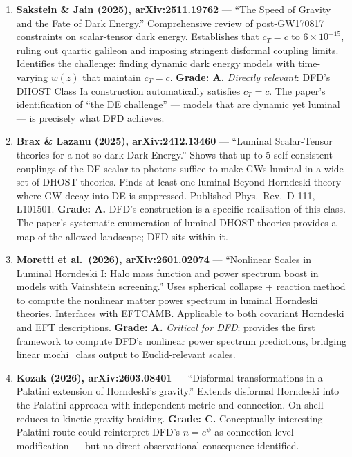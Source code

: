 \documentclass[11pt,a4paper]{article}
\begin{document}
\begin{enumerate}

\item \textbf{Sakstein \& Jain (2025), arXiv:2511.19762} --- ``The Speed of Gravity and the Fate of Dark Energy.'' Comprehensive review of post-GW170817 constraints on scalar-tensor dark energy. Establishes that $c_T = c$ to $6 \times 10^{-15}$, ruling out quartic galileon and imposing stringent disformal coupling limits. Identifies the challenge: finding dynamic dark energy models with time-varying $w(z)$ that maintain $c_T = c$. \textbf{Grade: A.} \emph{Directly relevant}: DFD's DHOST Class Ia construction automatically satisfies $c_T = c$. The paper's identification of ``the DE challenge'' --- models that are dynamic yet luminal --- is precisely what DFD achieves.

\item \textbf{Brax \& Lazanu (2025), arXiv:2412.13460} --- ``Luminal Scalar-Tensor theories for a not so dark Dark Energy.'' Shows that up to 5 self-consistent couplings of the DE scalar to photons suffice to make GWs luminal in a wide set of DHOST theories. Finds at least one luminal Beyond Horndeski theory where GW decay into DE is suppressed. Published Phys.\ Rev.\ D 111, L101501. \textbf{Grade: A.} DFD's construction is a specific realisation of this class. The paper's systematic enumeration of luminal DHOST theories provides a map of the allowed landscape; DFD sits within it.

\item \textbf{Moretti et al.\ (2026), arXiv:2601.02074} --- ``Nonlinear Scales in Luminal Horndeski I: Halo mass function and power spectrum boost in models with Vainshtein screening.'' Uses spherical collapse + reaction method to compute the nonlinear matter power spectrum in luminal Horndeski theories. Interfaces with EFTCAMB. Applicable to both covariant Horndeski and EFT descriptions. \textbf{Grade: A.} \emph{Critical for DFD}: provides the first framework to compute DFD's nonlinear power spectrum predictions, bridging linear mochi\_class output to Euclid-relevant scales.

\item \textbf{Kozak (2026), arXiv:2603.08401} --- ``Disformal transformations in a Palatini extension of Horndeski's gravity.'' Extends disformal Horndeski into the Palatini approach with independent metric and connection. On-shell reduces to kinetic gravity braiding. \textbf{Grade: C.} Conceptually interesting --- Palatini route could reinterpret DFD's $n = e^\psi$ as connection-level modification --- but no direct observational consequence identified.

\end{enumerate}
\end{document}
